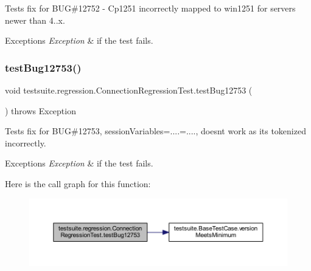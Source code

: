 Tests fix for B\+UG\#12752 -\/ Cp1251 incorrectly mapped to win1251 for servers newer than 4..\+x.


\begin{DoxyExceptions}{Exceptions}
{\em Exception} & if the test fails. \\
\hline
\end{DoxyExceptions}
\mbox{\label{classtestsuite_1_1regression_1_1_connection_regression_test_a16ab33fe936fd5b6fd19d3c284df8f59}} 
\subsubsection{\texorpdfstring{test\+Bug12753()}{testBug12753()}}
{\footnotesize\ttfamily void testsuite.\+regression.\+Connection\+Regression\+Test.\+test\+Bug12753 (\begin{DoxyParamCaption}{ }\end{DoxyParamCaption}) throws Exception}

Tests fix for B\+UG\#12753, session\+Variables=....=...., doesn\textquotesingle{}t work as it\textquotesingle{}s tokenized incorrectly.


\begin{DoxyExceptions}{Exceptions}
{\em Exception} & if the test fails. \\
\hline
\end{DoxyExceptions}
Here is the call graph for this function\+:
\nopagebreak
\begin{figure}[H]
\begin{center}
\leavevmode
\includegraphics[width=350pt]{classtestsuite_1_1regression_1_1_connection_regression_test_a16ab33fe936fd5b6fd19d3c284df8f59_cgraph}
\end{center}
\end{figure}
\mbox{\label{classtestsuite_1_1regression_1_1_connection_regression_test_a4a84b1ea9f0518f341a3588f6c999033}} 
